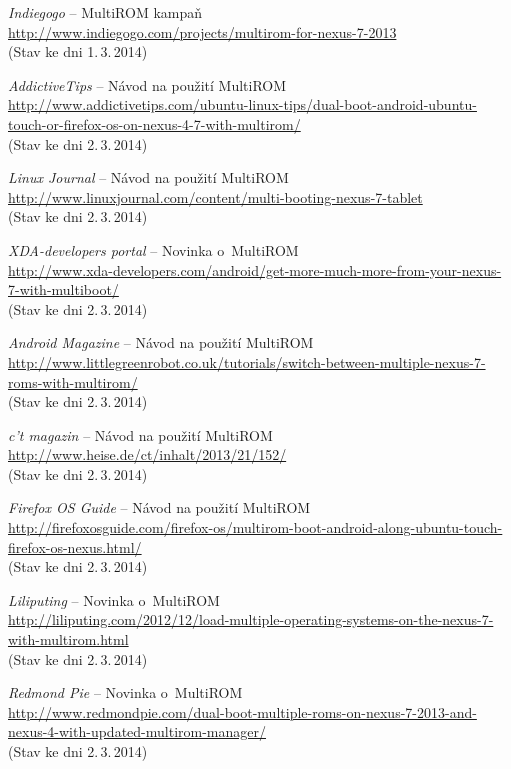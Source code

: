 \documentclass[12pt, a4paper, oneside]{article}
\newcommand{\It}{\textit}  %
\begin{document}
\begin{thebibliography}{99}
     \It{Indiegogo} -- MultiROM kampaň\\
    \url{http://www.indiegogo.com/projects/multirom-for-nexus-7-2013}\\
    (Stav ke dni 1.\,3.\,2014)

     \It{AddictiveTips} -- Návod na použití MultiROM\\
    \url{http://www.addictivetips.com/ubuntu-linux-tips/dual-boot-android-ubuntu-touch-or-firefox-os-on-nexus-4-7-with-multirom/}\\
    (Stav ke dni 2.\,3.\,2014)

     \It{Linux Journal} -- Návod na použití MultiROM\\
    \url{http://www.linuxjournal.com/content/multi-booting-nexus-7-tablet}\\
    (Stav ke dni 2.\,3.\,2014)

     \It{XDA-developers portal} -- Novinka o~MultiROM\\
    \url{http://www.xda-developers.com/android/get-more-much-more-from-your-nexus-7-with-multiboot/}\\
    (Stav ke dni 2.\,3.\,2014)

     \It{Android Magazine} -- Návod na použití MultiROM\\
    \url{http://www.littlegreenrobot.co.uk/tutorials/switch-between-multiple-nexus-7-roms-with-multirom/}\\
    (Stav ke dni 2.\,3.\,2014)

     \It{c't magazin} -- Návod na použití MultiROM\\
    \url{http://www.heise.de/ct/inhalt/2013/21/152/}\\
    (Stav ke dni 2.\,3.\,2014)

     \It{Firefox OS Guide} -- Návod na použití MultiROM\\
    \url{http://firefoxosguide.com/firefox-os/multirom-boot-android-along-ubuntu-touch-firefox-os-nexus.html/}\\
    (Stav ke dni 2.\,3.\,2014)

     \It{Liliputing} -- Novinka o~MultiROM\\
    \url{http://liliputing.com/2012/12/load-multiple-operating-systems-on-the-nexus-7-with-multirom.html}\\
    (Stav ke dni 2.\,3.\,2014)

     \It{Redmond Pie} -- Novinka o~MultiROM\\
    \url{http://www.redmondpie.com/dual-boot-multiple-roms-on-nexus-7-2013-and-nexus-4-with-updated-multirom-manager/}\\
    (Stav ke dni 2.\,3.\,2014)


\end{thebibliography}
\end{document}
